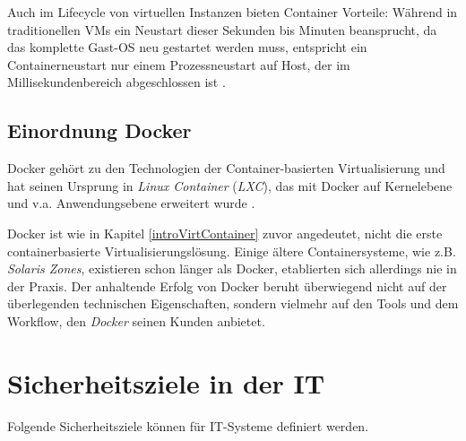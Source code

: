 \documentclass[../main.tex]{subfiles}
\begin{document}

			Auch im Lifecycle von virtuellen Instanzen bieten Container Vorteile: Während in traditionellen \acrshort{VM}s ein Neustart dieser Sekunden bis Minuten beansprucht, da das komplette Gast-\acrshort{OS} neu gestartet werden muss, entspricht ein Containerneustart nur einem Prozessneustart auf Host, der im Millisekundenbereich abgeschlossen ist \cite[S.2]{dockerLXCKub}.

	  \subsection{Einordnung Docker}
      Docker gehört zu den Technologien der Container-basierten Virtualisierung und hat seinen Ursprung in \emph{Linux Container} (\emph{LXC}), das mit Docker auf Kernelebene und v.a. Anwendungsebene erweitert wurde \cite[S.7]{dockerBook}\cite[S.1]{containerVirtPerformance}\cite[S.2]{dockerLXCKub}.


      Docker ist wie in Kapitel \ref{introVirtContainer} zuvor angedeutet, nicht die erste containerbasierte Virtualisierungslösung. Einige ältere Containersysteme, wie z.B. \emph{Solaris Zones}, existieren schon länger als Docker, etablierten sich allerdings nie in der Praxis. Der anhaltende Erfolg von Docker beruht überwiegend nicht auf der überlegenden technischen Eigenschaften, sondern vielmehr auf den Tools und dem Workflow, den \emph{Docker} seinen Kunden anbietet.


  \section{Sicherheitsziele in der IT}
  \label{introSecGoals}
		Folgende Sicherheitsziele können für \acrshort{IT}-Systeme definiert werden.


\end{document}
